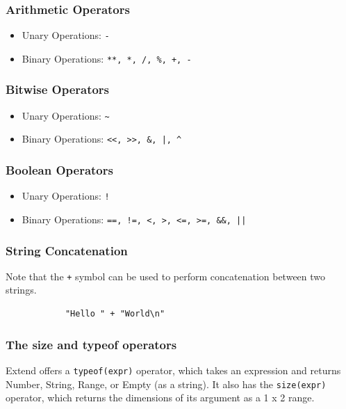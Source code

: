 		\subsubsection{Arithmetic Operators}
			\begin{itemize}
				\item Unary Operations: \texttt{-}
				\item Binary Operations: \texttt{**, *, /, \%, +, -}
			\end{itemize}

		\subsubsection{Bitwise Operators}
			\begin{itemize}
				\item Unary Operations: \texttt{\~}
				\item Binary Operations: \texttt{<<, >>, \&, |, \^}
			\end{itemize}

		\subsubsection{Boolean Operators}
			\begin{itemize}
				\item Unary Operations: \texttt{!}
				\item Binary Operations: \texttt{==, !=, <, >, <=, >=, \&\&, ||}
			\end{itemize}

		\subsubsection{String Concatenation}
		Note that the \texttt{+} symbol can be used to perform concatenation between two strings.

		\begin{lstlisting}
			"Hello " + "World\n"
		\end{lstlisting}

		\subsubsection{The size and typeof operators}
		Extend offers a \texttt{typeof(expr)} operator, which takes an expression and returns Number, String, Range, or Empty (as a string). It also has the \texttt{size(expr)} operator, which returns the dimensions of its argument as a 1 x 2 range.


